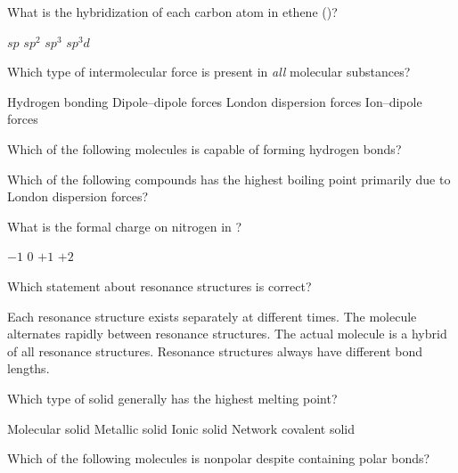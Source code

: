 \documentclass[addpoints]{exam}
\begin{document}
\begin{questions}
\question[1] What is the hybridization of each carbon atom in ethene ()?
\begin{choices}
    \choice $sp$
    \correctchoice $sp^2$
    \choice $sp^3$
    \choice $sp^3d$
\end{choices}

\question[1] Which type of intermolecular force is present in \textit{all} molecular substances?
\begin{choices}
    \choice Hydrogen bonding
    \choice Dipole--dipole forces
    \correctchoice London dispersion forces
    \choice Ion--dipole forces
\end{choices}

\question[1] Which of the following molecules is capable of forming hydrogen bonds?
\begin{choices}
    \choice {}
    \choice {}
    \choice {}
    \correctchoice {}
\end{choices}

\question[1] Which of the following compounds has the highest boiling point primarily due to London dispersion forces?
\begin{choices}
    \choice {}
    \choice {}
    \choice {}
    \correctchoice {}
\end{choices}

\question[1] What is the formal charge on nitrogen in ?
\begin{choices}
    \choice $-1$
    \choice $0$
    \correctchoice $+1$
    \choice $+2$
\end{choices}

\question[1] Which statement about resonance structures is correct?
\begin{choices}
    \choice Each resonance structure exists separately at different times.
    \choice The molecule alternates rapidly between resonance structures.
    \correctchoice The actual molecule is a hybrid of all resonance structures.
    \choice Resonance structures always have different bond lengths.
\end{choices}

\question[1] Which type of solid generally has the highest melting point?
\begin{choices}
    \choice Molecular solid
    \choice Metallic solid
    \choice Ionic solid
    \correctchoice Network covalent solid
\end{choices}

\question[1] Which of the following molecules is nonpolar despite containing polar bonds?
\begin{choices}
    \choice {}
    \choice {}
    \correctchoice {}
    \choice {}
\end{choices}



\end{questions}
\end{document}
